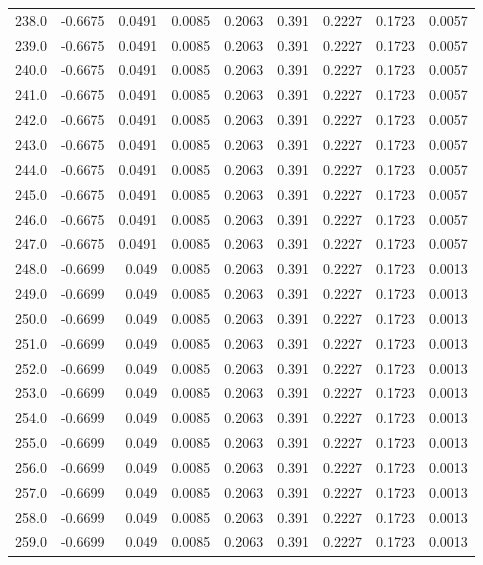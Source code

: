 \begin{longtable}{lrrrrrrrr}
238.0 & -0.6675 & 0.0491 & 0.0085 & 0.2063 & 0.391 & 0.2227 & 0.1723 & 0.0057 \\
239.0 & -0.6675 & 0.0491 & 0.0085 & 0.2063 & 0.391 & 0.2227 & 0.1723 & 0.0057 \\
240.0 & -0.6675 & 0.0491 & 0.0085 & 0.2063 & 0.391 & 0.2227 & 0.1723 & 0.0057 \\
241.0 & -0.6675 & 0.0491 & 0.0085 & 0.2063 & 0.391 & 0.2227 & 0.1723 & 0.0057 \\
242.0 & -0.6675 & 0.0491 & 0.0085 & 0.2063 & 0.391 & 0.2227 & 0.1723 & 0.0057 \\
243.0 & -0.6675 & 0.0491 & 0.0085 & 0.2063 & 0.391 & 0.2227 & 0.1723 & 0.0057 \\
244.0 & -0.6675 & 0.0491 & 0.0085 & 0.2063 & 0.391 & 0.2227 & 0.1723 & 0.0057 \\
245.0 & -0.6675 & 0.0491 & 0.0085 & 0.2063 & 0.391 & 0.2227 & 0.1723 & 0.0057 \\
246.0 & -0.6675 & 0.0491 & 0.0085 & 0.2063 & 0.391 & 0.2227 & 0.1723 & 0.0057 \\
247.0 & -0.6675 & 0.0491 & 0.0085 & 0.2063 & 0.391 & 0.2227 & 0.1723 & 0.0057 \\
248.0 & -0.6699 & 0.049 & 0.0085 & 0.2063 & 0.391 & 0.2227 & 0.1723 & 0.0013 \\
249.0 & -0.6699 & 0.049 & 0.0085 & 0.2063 & 0.391 & 0.2227 & 0.1723 & 0.0013 \\
250.0 & -0.6699 & 0.049 & 0.0085 & 0.2063 & 0.391 & 0.2227 & 0.1723 & 0.0013 \\
251.0 & -0.6699 & 0.049 & 0.0085 & 0.2063 & 0.391 & 0.2227 & 0.1723 & 0.0013 \\
252.0 & -0.6699 & 0.049 & 0.0085 & 0.2063 & 0.391 & 0.2227 & 0.1723 & 0.0013 \\
253.0 & -0.6699 & 0.049 & 0.0085 & 0.2063 & 0.391 & 0.2227 & 0.1723 & 0.0013 \\
254.0 & -0.6699 & 0.049 & 0.0085 & 0.2063 & 0.391 & 0.2227 & 0.1723 & 0.0013 \\
255.0 & -0.6699 & 0.049 & 0.0085 & 0.2063 & 0.391 & 0.2227 & 0.1723 & 0.0013 \\
256.0 & -0.6699 & 0.049 & 0.0085 & 0.2063 & 0.391 & 0.2227 & 0.1723 & 0.0013 \\
257.0 & -0.6699 & 0.049 & 0.0085 & 0.2063 & 0.391 & 0.2227 & 0.1723 & 0.0013 \\
258.0 & -0.6699 & 0.049 & 0.0085 & 0.2063 & 0.391 & 0.2227 & 0.1723 & 0.0013 \\
259.0 & -0.6699 & 0.049 & 0.0085 & 0.2063 & 0.391 & 0.2227 & 0.1723 & 0.0013 \\

\end{longtable}
